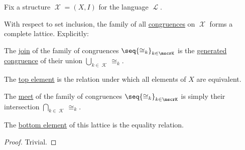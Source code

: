 \begin{proposition}\label{thm:congruences_form_complete_lattice}
  Fix a structure \( \mscrX = (X, I) \) for the language \( \mscrL \).

  With respect to set inclusion, the family of all \hyperref[def:first_order_congruence]{congruences} on \( \mscrX \) forms a complete lattice. Explicitly:
  \begin{thmenum}
     The \hyperref[def:semilattice/join]{join} of the family of congruences \( \seq{ {\cong_k} }_{k \in \mscrK} \) is the \hyperref[def:first_order_generated_congruence]{generated congruence} of their union \( \bigcup_{k \in \mscrK} {\cong_k} \).

     The \hyperref[def:extremal_points/top_and_bottom]{top element} is the relation under which all elements of \( X \) are equivalent.

     The \hyperref[def:semilattice/meet]{meet} of the family of congruences \( \seq{ {\cong_k} }_{k \in \mscrK} \) is simply their intersection \( \bigcap_{k \in \mscrK} {\cong_k} \).

     The \hyperref[def:extremal_points/top_and_bottom]{bottom element} of this lattice is the equality relation.
  \end{thmenum}
\end{proposition}
\begin{proof}
  Trivial.
\end{proof}

